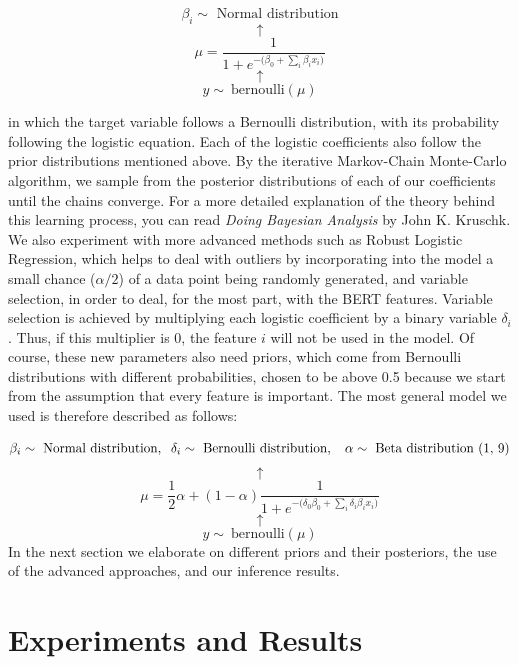 \[\beta_i \sim \text{ Normal distribution} \] \[ \uparrow \] 
\begin{equation} 
\label{Bern} 
\mu = \frac{1}{1 + e^{-\big(\beta_0 + \sum_i \beta_i x_i \big)}} 
\end{equation}
\vspace{0.01mm} \[ \uparrow \] \[ y \sim\ \text{bernoulli} (\mu) \]

in which the target variable follows a Bernoulli distribution, with its probability following the logistic equation. Each of the logistic coefficients also follow the prior distributions mentioned above. By the iterative Markov-Chain Monte-Carlo algorithm, we sample from the posterior distributions of each of our coefficients until the chains converge. For a more detailed explanation of the theory behind this learning process, you can read \textit{Doing Bayesian Analysis} by John K. Kruschk. We also experiment with more advanced methods such as Robust Logistic Regression, which helps to deal with outliers by incorporating into the model a small chance ($\alpha/2$) of a data point being randomly generated, and variable selection, in order to deal, for the most part, with the BERT features. Variable selection is achieved by multiplying each logistic coefficient by a binary variable $\delta_i$. Thus, if this multiplier is 0, the feature $i$ will not be used in the model. Of course, these new parameters also need priors, which come from Bernoulli distributions with different probabilities, chosen to be above 0.5 because we start from the assumption that every feature is important. The most general model we used is therefore described as follows:

\[\beta_i \sim \text{ Normal distribution}, \hspace{2mm} \delta_i \sim \text{ Bernoulli distribution}, \hspace{2mm}\ \alpha \sim \text{ Beta distribution (1, 9)} \] \[ \uparrow \] \[ \mu = \frac{1}{2} \alpha + (1 - \alpha) \frac{1}{1 + e^{-\big(\delta_0 \beta_0 + \sum_i \delta_i \beta_i x_i \big)}} \] \vspace{0.01mm} \[ \uparrow \] \[ y \sim\ \text{bernoulli} (\mu) \]
In the next section we elaborate on different priors and their posteriors, the use of the advanced approaches, and our inference results.

\section{Experiments and Results}

